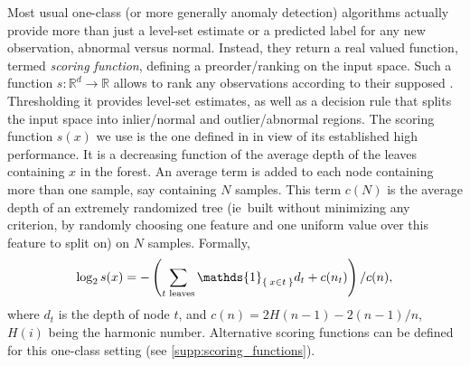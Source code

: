 Most usual one-class (or more generally anomaly detection) algorithms actually
provide more than just a level-set estimate or a predicted label for any new
observation, abnormal versus normal. Instead, they return a real valued
function, termed \emph{scoring function}, defining a preorder/ranking on the
input space. Such a function $s: \mathbb{R}^d \to \mathbb{R}$ allows to rank
any observations according to their supposed .
Thresholding it provides level-set estimates, as well as a decision rule that
splits the input space into inlier/normal and outlier/abnormal regions.
%
%
The scoring function $s(x)$ we use is the one defined in \citet{Liu2008} in
view of its established high performance. It is a decreasing function of the
average depth of the leaves containing $x$ in the forest. 
An average term is added to each node containing more than one sample, say
containing $N$ samples. This term $c(N)$ is the average depth of an extremely
randomized tree \citep{Geurts2006} (\acs{ie}~built without minimizing any
criterion, by randomly choosing one feature and one uniform value over this
feature to split on) on $N$ samples. Formally,
\begin{dmath}
    \label{ocrf:eq:scoring3}
    \log_2 s(x) = -\left(\sum_{t \text{~leaves}} \mathds{1}_{\Set{x \in t}} d_t
    + c(n_t)\right) / c(n),
\end{dmath}
where $d_t$ is the depth of node $t$, and $c(n) = 2H(n - 1) - 2(n - 1)/n$,
$H(i)$ being the harmonic number. Alternative scoring functions can be defined
for this one-class setting (see \cref{supp:scoring_functions}).
%
%
%
